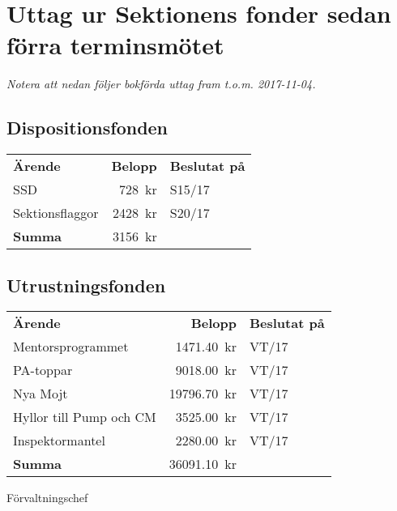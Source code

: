 \documentclass[../_main/handlingar.tex]{subfiles}
\begin{document}
\section{Uttag ur Sektionens fonder sedan förra terminsmötet}
\emph{Notera att nedan följer bokförda uttag fram t.o.m. 2017-11-04.}

\subsection*{Dispositionsfonden}
\begin{tabular}{l r l}
    \textbf{Ärende} & \textbf{Belopp} & \textbf{Beslutat på} \\
    SSD & \SI{728}{kr} & S15/17 \\
    Sektionsflaggor & \SI{2428}{kr} & S20/17 \\
    \hline
    \textbf{Summa} & \SI{3156}{kr} \\
\end{tabular}

\subsection*{Utrustningsfonden}
\begin{tabular}{l r l}
    \textbf{Ärende} & \textbf{Belopp} & \textbf{Beslutat på} \\
    Mentorsprogrammet & \SI{1471.40}{kr} & VT/17 \\
    PA-toppar & \SI{9018.00}{kr} & VT/17 \\
    Nya Mojt & \SI{19796.70}{kr} & VT/17 \\
    Hyllor till Pump och CM & \SI{3525.00}{kr} & VT/17 \\
    Inspektormantel & \SI{2280.00}{kr} & VT/17 \\
    \hline
    \textbf{Summa} & \SI{36091.10}{kr} \\
\end{tabular}

\begin{signatures}{1}
    \ist
    \signature{Sophia Grimmeiss Grahm}{Förvaltningschef}
\end{signatures}
\end{document}
